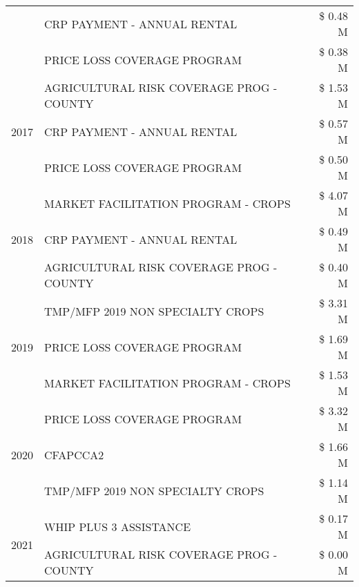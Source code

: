 \begin{tabular}{llr}
 & CRP PAYMENT - ANNUAL RENTAL & \$ 0.48 M \\
 & PRICE LOSS COVERAGE PROGRAM & \$ 0.38 M \\
\cline{1-3}
\multirow[t]{3}{*}{2017} & AGRICULTURAL RISK COVERAGE PROG - COUNTY & \$ 1.53 M \\
 & CRP PAYMENT - ANNUAL RENTAL & \$ 0.57 M \\
 & PRICE LOSS COVERAGE PROGRAM & \$ 0.50 M \\
\cline{1-3}
\multirow[t]{3}{*}{2018} & MARKET FACILITATION PROGRAM - CROPS & \$ 4.07 M \\
 & CRP PAYMENT - ANNUAL RENTAL & \$ 0.49 M \\
 & AGRICULTURAL RISK COVERAGE PROG - COUNTY & \$ 0.40 M \\
\cline{1-3}
\multirow[t]{3}{*}{2019} & TMP/MFP 2019 NON SPECIALTY CROPS & \$ 3.31 M \\
 & PRICE LOSS COVERAGE PROGRAM & \$ 1.69 M \\
 & MARKET FACILITATION PROGRAM - CROPS & \$ 1.53 M \\
\cline{1-3}
\multirow[t]{3}{*}{2020} & PRICE LOSS COVERAGE PROGRAM & \$ 3.32 M \\
 & CFAPCCA2 & \$ 1.66 M \\
 & TMP/MFP 2019 NON SPECIALTY CROPS & \$ 1.14 M \\
\cline{1-3}
\multirow[t]{2}{*}{2021} & WHIP PLUS 3 ASSISTANCE & \$ 0.17 M \\
 & AGRICULTURAL RISK COVERAGE PROG - COUNTY & \$ 0.00 M \\
\cline{1-3}
\bottomrule
\end{tabular}
